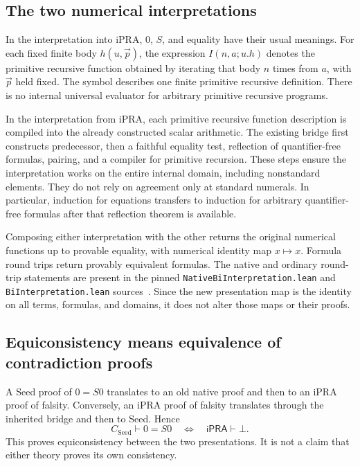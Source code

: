 \documentclass[11pt,letterpaper]{article}
\newcommand{\ipra}{\mathsf{iPRA}}
\newcommand{\file}[1]{\nolinkurl{#1}}
\begin{document}
\subsection{The two numerical interpretations}

In the interpretation into iPRA, $0$, $S$, and equality have their usual
meanings. For each fixed finite body $h(u,\vec p)$, the expression
$I(n,a;u.h)$ denotes the primitive recursive function obtained by iterating
that body $n$ times from $a$, with $\vec p$ held fixed. The symbol describes
one finite primitive recursive definition. There is no internal universal
evaluator for arbitrary primitive recursive programs.

In the interpretation from iPRA, each primitive recursive function
description is compiled into the already constructed scalar arithmetic.
The existing bridge first constructs predecessor, then a faithful equality
test, reflection of quantifier-free formulas, pairing, and a compiler for
primitive recursion. These steps ensure the interpretation works on the
entire internal domain, including nonstandard elements. They do not rely
on agreement only at standard numerals. In particular, induction for
equations transfers to induction for arbitrary quantifier-free formulas
after that reflection theorem is available.

Composing either interpretation with the other returns the original
numerical functions up to provable equality, with numerical identity map
$x\mapsto x$. Formula round trips return provably equivalent formulas.
The native and ordinary round-trip statements are present in the pinned
\file{NativeBiInterpretation.lean} and \file{BiInterpretation.lean}
sources~\cite{bridge,ordinarybridge}. Since the new presentation map is
the identity on all terms, formulas, and domains, it does not alter those
maps or their proofs.

\subsection{Equiconsistency means equivalence of contradiction proofs}

A Seed proof of $0=S0$ translates to an old native proof and then to an
iPRA proof of falsity. Conversely, an iPRA proof of falsity translates
through the inherited bridge and then to Seed. Hence
\[
 C_{\mathrm{Seed}}\vdash 0=S0
 \quad\Longleftrightarrow\quad
 \ipra\vdash\bot.
\]
This proves equiconsistency between the two presentations. It is not a
claim that either theory proves its own consistency.
\end{document}
